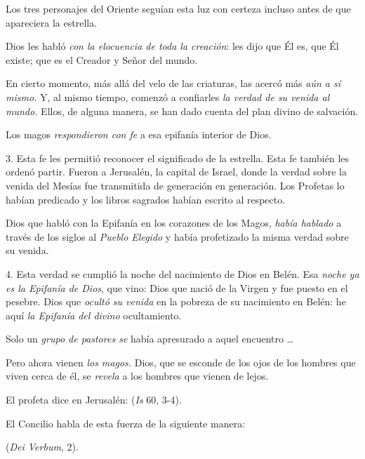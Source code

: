 \begin{body}
	Los tres personajes del Oriente seguían esta luz con certeza incluso antes de que apareciera la estrella.

	Dios les habló \emph{con la elocuencia de toda la creación}: les dijo que Él es, que Él existe; que es el Creador y Señor del mundo.

	En cierto momento, más allá del velo de las criaturas, las acercó más \emph{aún a sí mismo.} Y, al mismo tiempo, comenzó a confiarles \emph{la verdad de su venida al mundo.} Ellos, de alguna manera, se han dado cuenta del plan divino de salvación.

	Los magos \emph{respondieron con fe} a esa epifanía interior de Dios.

	3. Esta fe les permitió reconocer el significado de la estrella. Esta fe también les ordenó partir. Fueron a Jerusalén, la capital de Israel, donde la verdad sobre la venida del Mesías fue transmitida de generación en generación. Los Profetas lo habían predicado y los libros sagrados habían escrito al respecto.

	Dios que habló con la Epifanía en los corazones de los Magos, \emph{había hablado} a través de los siglos al \emph{Pueblo Elegido} y había profetizado la misma verdad sobre su venida.

	4. Esta verdad se cumplió la noche del nacimiento de Dios en Belén. Esa \emph{noche ya es la Epifanía de Dios}, que vino: Dios que nació de la Virgen y fue puesto en el pesebre. Dios que \emph{ocultó su venida} en la pobreza de su nacimiento en Belén: he aquí \emph{la Epifanía del divino} ocultamiento.

	Solo un \emph{grupo de pastores se} había apresurado a aquel encuentro \ldots{}

	Pero ahora vienen \emph{los magos.} Dios, que se esconde de los ojos de los hombres que viven cerca de él, se \emph{revela} a los hombres que vienen de lejos.

	El profeta dice en Jerusalén:  (\emph{Is} 60, 3-4).

	El Concilio habla de esta fuerza de la siguiente manera:

	 (\emph{Dei Verbum}, 2).


\end{body}
